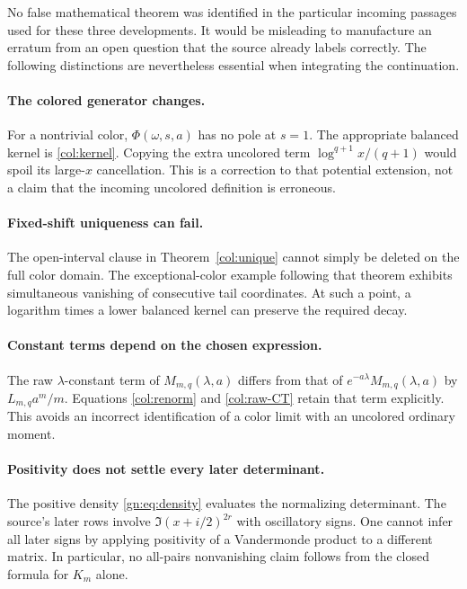 \documentclass[11pt,a4paper]{article}
\numberwithin{equation}{section}
\theoremstyle{definition}
\theoremstyle{remark}
\begin{document}
No false mathematical theorem was identified in the particular
incoming passages used for these three developments. It would be
misleading to manufacture an erratum from an open question that
the source already labels correctly. The following distinctions
are nevertheless essential when integrating the continuation.

\paragraph{The colored generator changes.}
For a nontrivial color, $\Phi(\omega,s,a)$ has no pole at $s=1$.
The appropriate balanced kernel is \eqref{col:kernel}. Copying
the extra uncolored term $\log^{q+1}x/(q+1)$ would spoil its
large-$x$ cancellation. This is a correction to that potential
extension, not a claim that the incoming uncolored definition
is erroneous.

\paragraph{Fixed-shift uniqueness can fail.}
The open-interval clause in Theorem~\ref{col:unique} cannot simply
be deleted on the full color domain. The exceptional-color
example following that theorem exhibits simultaneous vanishing
of consecutive tail coordinates. At such a point, a logarithm
times a lower balanced kernel can preserve the required decay.

\paragraph{Constant terms depend on the chosen expression.}
The raw $\lambda$-constant term of
$M_{m,q}(\lambda,a)$ differs from that of
$e^{-a\lambda}M_{m,q}(\lambda,a)$ by $L_{m,q}a^m/m$.
Equations \eqref{col:renorm} and \eqref{col:raw-CT} retain that
term explicitly. This avoids an incorrect identification of a
color limit with an uncolored ordinary moment.

\paragraph{Positivity does not settle every later determinant.}
The positive density \eqref{gn:eq:density} evaluates the
normalizing determinant. The source's later rows involve
$\Im(x+i/2)^{2r}$ with oscillatory signs. One cannot infer all
later signs by applying positivity of a Vandermonde product to
a different matrix. In particular, no all-pairs nonvanishing
claim follows from the closed formula for $K_m$ alone.
\end{document}
